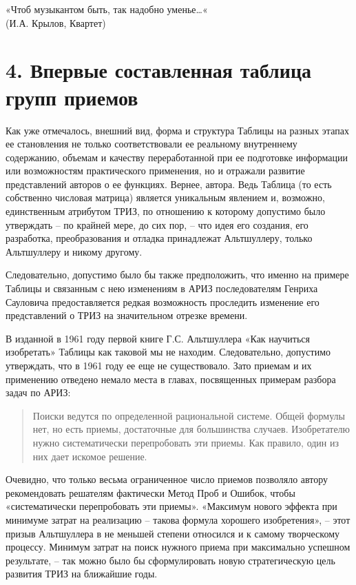 \documentclass[11pt,a4paper]{article}
\begin{document}
\begin{flushright}
  «Чтоб музыкантом быть, так надобно уменье…«\\
  (И.А. Крылов, Квартет)
\end{flushright}
\section*{4. Впервые составленная таблица групп приемов}

Как уже отмечалось, внешний вид, форма и структура Таблицы на разных этапах ее
становления не только соответствовали ее реальному внутреннему содержанию,
объемам и качеству переработанной при ее подготовке информации или
возможностям практического применения, но и отражали развитие представлений
авторов о ее функциях. Вернее, автора. Ведь Таблица (то есть собственно
числовая матрица) является уникальным явлением и, возможно, единственным
атрибутом ТРИЗ, по отношению к которому допустимо было утверждать -- по
крайней мере, до сих пор, -- что идея его создания, его разработка,
преобразования и отладка принадлежат Альтшуллеру, только Альтшуллеру и никому
другому.

Следовательно, допустимо было бы также предположить, что именно на примере
Таблицы и связанным с нею изменениям в АРИЗ последователям Генриха Сауловича
предоставляется редкая возможность проследить изменение его представлений о
ТРИЗ на значительном отрезке времени.

В изданной в 1961 году первой книге Г.С. Альтшуллера «Как научиться
изобретать» \cite{Altshuller1961} Таблицы как таковой мы не находим.
Следовательно, допустимо утверждать, что в 1961 году ее еще не существовало.
Зато приемам и их применению отведено немало места в главах, посвященных
примерам разбора задач по АРИЗ: 
\begin{quote}
  Поиски ведутся по определенной рациональной системе. Общей формулы нет, но
  есть приемы, достаточные для большинства случаев. Изобретателю нужно
  систематически перепробовать эти приемы. Как правило, один из них дает
  искомое решение.
\end{quote}

Очевидно, что только весьма ограниченное число приемов позволяло автору
рекомендовать решателям фактически Метод Проб и Ошибок, чтобы «систематически
перепробовать эти приемы». «Максимум нового эффекта при минимуме затрат на
реализацию -- такова формула хорошего изобретения», -- этот призыв Альтшуллера
в не меньшей степени относился и к самому творческому процессу. Минимум затрат
на поиск нужного приема при максимально успешном результате, -- так можно было
бы сформулировать новую стратегическую цель развития ТРИЗ на ближайшие годы.
\end{document}
